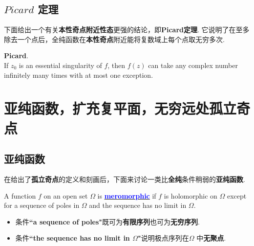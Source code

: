 \newpage
\subsection{$Picard$ 定理}
	下面给出一个有关\textbf{本性奇点附近性态}更强的结论，即\textbf{Picard定理}. 它说明了在至多除去一个点后，全纯函数在\textbf{本性奇点}附近能将复数域上每个点取无穷多次.
	
	\begin{thm}\label{thm 8.5.2}
		\textbf{Picard}. \\
		If $z_0$ is an essential singularity of $f$, then $f(z)$ can take any complex number infinitely many times with at most one exception.
	\end{thm}

\newpage
\section{亚纯函数，扩充复平面，无穷远处孤立奇点}
\subsection{亚纯函数}
	在给出了\textbf{孤立奇点}的定义和刻画后，下面来讨论一类比\textbf{全纯}条件稍弱的\textbf{亚纯函数}.
	\begin{defn}\label{def 8.6.1}
		A function $f$ on an open set $\Omega$ is \underline{\textcolor{blue}{\textbf{meromorphic}}} if $f$ is holomorphic on $\Omega$ except for a sequence of poles in $\Omega$ and the sequence has no limit in $\Omega$.
		
		\vspace{1em}
		\begin{rmk}
			\begin{itemize}
				\item 条件\textbf{``a sequence of poles"}既可为\textbf{有限序列}也可为\textbf{无穷序列}.
				
				\item 条件\textbf{``the sequence has no limit in $\Omega$"}说明极点序列在$\Omega$ 中\textbf{无聚点}.
			\end{itemize}
		\end{rmk}
	\end{defn}

	\vspace{2em}
	
